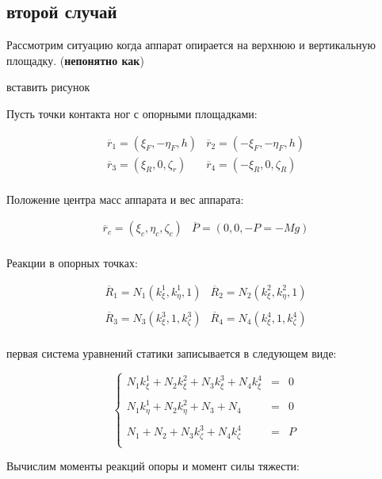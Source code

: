 \subsection{второй случай}

Рассмотрим ситуацию когда аппарат опирается на верхнюю и вертикальную площадку. (\textbf{непонятно как})

вставить рисунок


Пусть точки контакта ног с опорными площадками:

$$
\begin{array}{ll}
\overline{r}_1 = (\xi_F,-\eta_F,h) & \overline{r}_2 = (-\xi_F,-\eta_F,h)\\
\overline{r}_3 = (\xi_R,0,\zeta_r) & \overline{r}_4 = (-\xi_R,0,\zeta_R)\\
\end{array}
$$

Положение центра масс аппарата и вес аппарата:

$$
\begin{array}{cc}
\overline{r}_c = (\xi_c,\eta_c,\zeta_c) & \overline{P} = (0,0,-P = -Mg)\\
\end{array}
$$

Реакции в опорных точках:

$$
\begin{array}{ll}
\overline{R}_1 = N_1(k_\xi^1,k_\eta^1,1) & \overline{R}_2 = N_2(k_\xi^2,k_\eta^2,1)\\
\\
\overline{R}_3 = N_3(k_\xi^3,1,k_\zeta^3) & \overline{R}_4 = N_4(k_\xi^4,1,k_\zeta^4)\\
\end{array}
$$

первая система уравнений статики записывается в следующем виде:

\begin{equation}
\left\{
\begin{array}{rcl}
    N_1k_\xi^1+N_2k_\xi^2+N_3k_\xi^3+N_4k_\xi^4 & = & 0\\
    \\
    N_1k_\eta^1+N_2k_\eta^2+N_3+N_4 & = & 0\\
    \\
    N_1+N_2+N_3k_\zeta^3+N_4k_\zeta^4 & = & P\\
\end{array}
\right.
\end{equation}

Вычислим моменты реакций опоры и момент силы тяжести:

